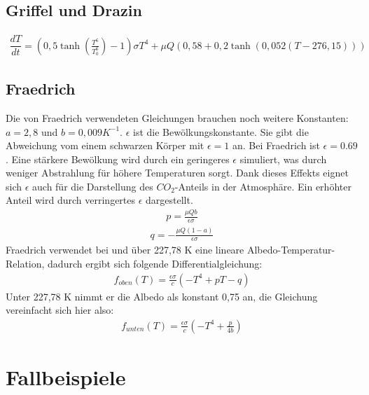 \documentclass[]{report}
\begin{document}
\section{Griffel und Drazin}
	\begin{align}
		\dfrac{dT}{dt} = (0,5 \tanh\left(\frac{T^6}{T_0^6}\right)-1) \sigma T^4 + \mu Q (0,58 + 0,2 \tanh (0,052 (T - 276,15)))
	\end{align}
\section{Fraedrich}

Die von Fraedrich verwendeten Gleichungen brauchen noch weitere Konstanten: $a=2,8$ und $b=0,009 K^{-1}$. $\epsilon$ ist die Bewölkungskonstante. Sie gibt die Abweichung vom einem schwarzen Körper mit $\epsilon=1$ an. Bei Fraedrich ist $\epsilon = 0.69$. Eine stärkere Bewölkung wird durch ein geringeres $\epsilon$ simuliert, was durch weniger Abstrahlung für höhere Temperaturen sorgt. Dank dieses Effekts eignet sich $\epsilon$ auch für die Darstellung des $CO_2$-Anteils in der Atmosphäre. Ein erhöhter Anteil wird durch verringertes $\epsilon$ dargestellt.
	\begin{align}
		p=\frac{\mu Q b}{\epsilon \sigma}
	\end{align}
	\begin{align}
		q = - \frac{\mu Q (1-a)}{\epsilon \sigma}
	\end{align}
	Fraedrich verwendet bei und über 227,78 K eine lineare Albedo-Temperatur-Relation, dadurch ergibt sich folgende Differentialgleichung:
	\begin{align}
		f_{oben}(T) = \frac{\epsilon \sigma}{c} (-T^4 + p T - q)
	\end{align}
	Unter 227,78 K nimmt er die Albedo als konstant 0,75 an, die Gleichung vereinfacht sich hier also:
	\begin{align}
		f_{unten}(T) = \frac{\epsilon \sigma}{c} (-T^4 + \frac{p}{4b})
	\end{align}
	

\chapter{Fallbeispiele}

\begin{figure}[h!] \centering \def\svgwidth{\columnwidth}  \caption{} \label{fr320} \end{figure}
\end{document}
